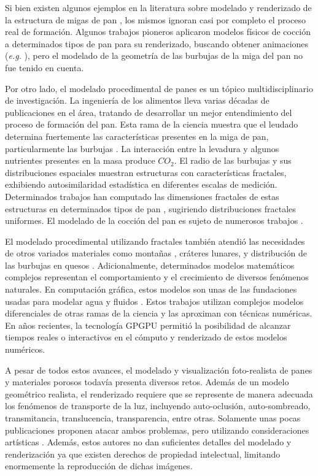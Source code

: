 \documentclass[spanish,a4paper,openright,11pt]{book}
\begin{document}
Si bien existen algunos ejemplos en la literatura sobre modelado y renderizado de la estructura de migas de pan \cite{Tong2005,Xenakis2007}, los mismos ignoran casi por completo el proceso real de formación.
Algunos trabajos pioneros aplicaron modelos físicos de cocción a determinados tipos de pan para su renderizado, buscando obtener animaciones ({\em e.g.} \cite{Rodriguez-Arenas2011}), pero el modelado de la geometría de las burbujas de la miga del pan no fue tenido en cuenta.

Por otro lado, el modelado procedimental de panes es un tópico multidisciplinario de investigación.
La ingeniería de los alimentos lleva varias décadas de publicaciones en el área, tratando de desarrollar un mejor entendimiento del proceso de formación del pan.
Esta rama de la ciencia muestra que el leudado determina fuertemente las características presentes en la miga de pan, particularmente las burbujas \cite{Babin2006}.
La interacción entre la levadura y algunos nutrientes presentes en la masa produce {\em $CO_{2}$}. 
El radio de las burbujas y sus distribuciones espaciales muestran estructuras con características fractales, exhibiendo autosimilaridad estadística en diferentes escalas de medición.
Determinados trabajos han computado las dimensiones fractales de estas estructuras en determinados tipos de pan \cite{Gonzales2008}, sugiriendo distribuciones fractales uniformes.
El modelado de la cocción del pan es sujeto de numerosos trabajos \cite{Mondal2008}.

El modelado procedimental utilizando fractales también atendió las necesidades de otros variados materiales como montañas \cite{Prusinkiewicz1993}, cráteres lunares, y distribución de las burbujas en quesos \cite{Mandelbrot1982}. 
Adicionalmente, determinados modelos matemáticos complejos representan el comportamiento y el crecimiento de diversos fenómenos naturales.
En computación gráfica, estos modelos son unas de las fundaciones usadas para modelar agua y fluidos \cite{Stam1999,Fedkiw2001}.
Estos trabajos utilizan complejos modelos diferenciales de otras ramas de la ciencia y las aproximan con técnicas numéricas.
En años recientes, la tecnología GPGPU \cite{Owens2007} permitió la posibilidad de alcanzar tiempos reales o interactivos en el cómputo y renderizado de estos modelos numéricos.

A pesar de todos estos avances, el modelado y visualización foto-realista de panes y materiales porosos todavía presenta diversos retos.
Además de un modelo geométrico realista, el renderizado requiere que se represente de manera adecuada los fenómenos de transporte de la luz, incluyendo auto-oclusión, auto-sombreado, transmitancia, translucencia, transparencia, entre otras.
Solamente unas pocas publicaciones proponen atacar ambos problemas, pero utilizando consideraciones artísticas \cite{Xenakis2007}.
Además, estos autores no dan suficientes detalles del modelado y renderización ya que existen derechos de propiedad intelectual, limitando enormemente la reproducción de dichas imágenes.
\end{document}
